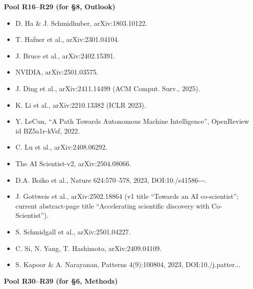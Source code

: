 \documentclass[11pt,a4paper]{article}
\begin{document}
\medskip
\noindent\textbf{Pool R16–R29 (for §8, Outlook)}\par\addvspace{2pt}

\begin{itemize}[leftmargin=1.6em,itemsep=2pt,parsep=0pt,topsep=3pt]
\item[R16.] D. Ha \& J. Schmidhuber, arXiv:1803.10122.
\item[R17.] T. Hafner et al., arXiv:2301.04104.
\item[R18.] J. Bruce et al., arXiv:2402.15391.
\item[R19.] NVIDIA, arXiv:2501.03575.
\item[R20.] J. Ding et al., arXiv:2411.14499 (ACM Comput. Surv., 2025).
\item[R21.] K. Li et al., arXiv:2210.13382 (ICLR 2023).
\item[R22.] Y. LeCun, ``A Path Towards Autonomous Machine Intelligence'', OpenReview id BZ5a1r-kVsf, 2022.
\item[R23.] C. Lu et al., arXiv:2408.06292.
\item[R24.] The AI Scientist-v2, arXiv:2504.08066.
\item[R25.] D.A. Boiko et al., Nature 624:570–578, 2023, DOI:10./\allowbreak s41586---.\allowbreak 
\item[R26.] J. Gottweis et al., arXiv:2502.18864 (v1 title ``Towards an AI co-scientist''; current abstract-page title ``Accelerating scientific discovery with Co-Scientist'').
\item[R27.] S. Schmidgall et al., arXiv:2501.04227.
\item[R28.] C. Si, N. Yang, T. Hashimoto, arXiv:2409.04109.
\item[R29.] S. Kapoor \& A. Narayanan, Patterns 4(9):100804, 2023, DOI:10./\allowbreak j.\allowbreak patter...\allowbreak 
\end{itemize}

\medskip
\noindent\textbf{Pool R30–R39 (for §6, Methods)}\par\addvspace{2pt}
\end{document}
